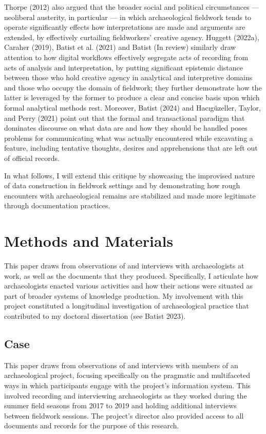 \documentclass[
]{article}
\begin{document}
Thorpe (2012) also argued that the broader social and political
circumstances --- neoliberal austerity, in particular --- in which
archaeological fieldwork tends to operate significantly effects how
interpretations are made and arguments are extended, by effectively
curtailing fieldworkers' creative agency. Huggett (2022a), Caraher
(2019), Batist et al. (2021) and Batist (In review) similarly draw
attention to how digital workflows effectively segregate acts of
recording from acts of analysis and interpretation, by putting
significant epistemic distance between those who hold creative agency in
analytical and interpretive domains and those who occupy the domain of
fieldwork; they further demonstrate how the latter is leveraged by the
former to produce a clear and concise basis upon which formal analytical
methods rest. Moreover, Batist (2024) and Hacıgüzeller, Taylor, and
Perry (2021) point out that the formal and transactional paradigm that
dominates discourse on what data are and how they should be handled
poses problems for communicating what was actually encountered while
excavating a feature, including tentative thoughts, desires and
apprehensions that are left out of official records.

In what follows, I will extend this critique by showcasing the
improvised nature of data construction in fieldwork settings and by
demonstrating how rough encounters with archaeological remains are
stabilized and made more legitimate through documentation practices.

\section{Methods and Materials}\label{methods-and-materials}

This paper draws from observations of and interviews with archaeologists
at work, as well as the documents that they produced. Specifically, I
articulate how archaeologists enacted various activities and how their
actions were situated as part of broader systems of knowledge
production. My involvement with this project constituted a longitudinal
investigation of archaeological practice that contributed to my doctoral
dissertation (see Batist 2023).

\subsection{Case}\label{case}

This paper draws from observations of and interviews with members of an
archaeological project, focusing specifically on the pragmatic and
multifaceted ways in which participants engage with the project's
information system. This involved recording and interviewing
archaeologists as they worked during the summer field seasons from 2017
to 2019 and holding additional interviews between fieldwork sessions.
The project's director also provided access to all documents and records
for the purpose of this research.
\end{document}
